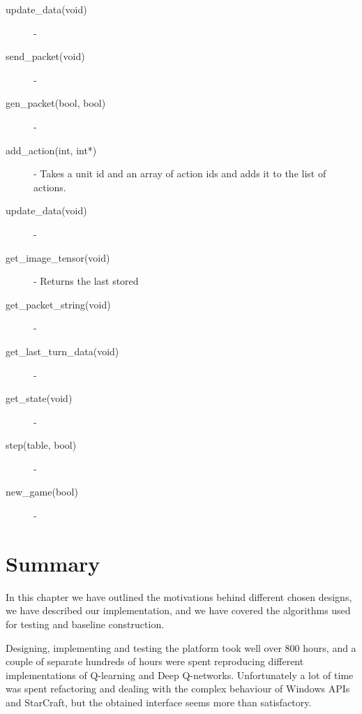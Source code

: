 \begin{description}
\item [update\_data(void)] -
\item [send\_packet(void)] -
\item [gen\_packet(bool, bool)] -
\item [add\_action(int, int*)] - Takes a unit id and an array of action ids and
  adds it to the list of actions.
\item [update\_data(void)] -
\item [get\_image\_tensor(void)] - Returns the last stored 
\item [get\_packet\_string(void)] -
\item [get\_last\_turn\_data(void)] -
\item [get\_state(void)] -
\item [step(table, bool)] -
\item [new\_game(bool)] -
\end{description}
  
\section{Summary}

In this chapter we have outlined the motivations behind different chosen
designs, we have described our implementation, and we have covered the algorithms
used for testing and baseline construction.

Designing, implementing and testing the platform took well over 800 hours, and a
couple of separate hundreds of hours were spent reproducing different
implementations of Q-learning and Deep Q-networks. Unfortunately a lot of time
was spent refactoring and dealing with the complex behaviour of Windows APIs and
StarCraft, but the obtained interface seems more than satisfactory.

